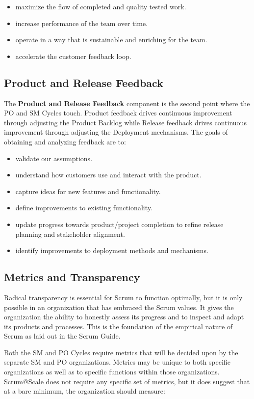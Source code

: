 \documentclass[12pt,a4paper,parskip=full]{scrartcl}
\begin{document}
\begin{itemize}
	\item maximize the flow of completed and quality tested work.
	\item increase performance of the team over time.
	\item operate in a way that is sustainable and enriching for the team.
	\item accelerate the customer feedback loop.
\end{itemize}

\subsection{Product and Release Feedback}

The \textbf{Product and Release Feedback} component is the second point where the PO and SM Cycles touch. Product feedback drives continuous improvement through adjusting the Product Backlog while Release feedback drives continuous improvement through adjusting the Deployment mechanisms. The goals of obtaining and analyzing feedback are to:

\begin{itemize}
	\item validate our assumptions.
	\item understand how customers use and interact with the product.
	\item capture ideas for new features and functionality.
	\item define improvements to existing functionality.
	\item update progress towards product/project completion to refine release planning and stakeholder alignment.
	\item identify improvements to deployment methods and mechanisms.
\end{itemize}

\subsection{Metrics and Transparency}

Radical transparency is essential for Scrum to function optimally, but it is only possible in an organization that has embraced the Scrum values. It gives the organization the ability to honestly assess its progress and to inspect and adapt its products and processes. This is the foundation of the empirical nature of Scrum as laid out in the Scrum Guide.

Both the SM and PO Cycles require metrics that will be decided upon by the separate SM and PO organizations. Metrics may be unique to both specific organizations as well as to specific functions within those organizations. Scrum@Scale does not require any specific set of metrics, but it does suggest that at a bare minimum, the organization should measure:
\end{document}
